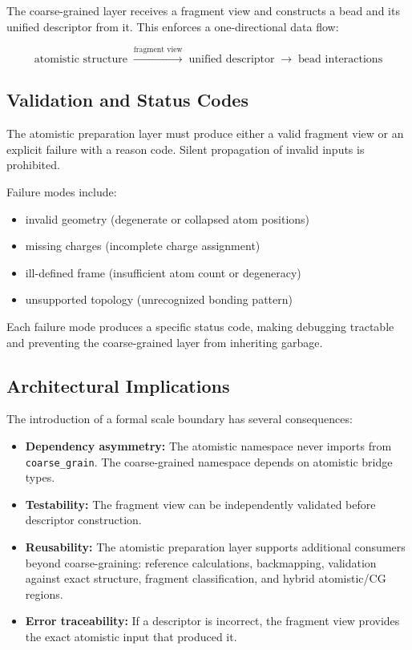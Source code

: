 \documentclass[11pt]{article}
\begin{document}
The coarse-grained layer receives a fragment view and constructs a bead and its unified descriptor from it. This enforces a one-directional data flow:

\begin{equation}
\text{atomistic structure} \;\xrightarrow{\text{fragment view}}\; \text{unified descriptor} \;\rightarrow\; \text{bead interactions}
\end{equation}

\subsection{Validation and Status Codes}

The atomistic preparation layer must produce either a valid fragment view or an explicit failure with a reason code. Silent propagation of invalid inputs is prohibited.

Failure modes include:

\begin{itemize}
    \item invalid geometry (degenerate or collapsed atom positions)
    \item missing charges (incomplete charge assignment)
    \item ill-defined frame (insufficient atom count or degeneracy)
    \item unsupported topology (unrecognized bonding pattern)
\end{itemize}

Each failure mode produces a specific status code, making debugging tractable and preventing the coarse-grained layer from inheriting garbage.

\subsection{Architectural Implications}

The introduction of a formal scale boundary has several consequences:

\begin{itemize}
    \item \textbf{Dependency asymmetry:} The atomistic namespace never imports from \texttt{coarse\_grain}. The coarse-grained namespace depends on atomistic bridge types.
    \item \textbf{Testability:} The fragment view can be independently validated before descriptor construction.
    \item \textbf{Reusability:} The atomistic preparation layer supports additional consumers beyond coarse-graining: reference calculations, backmapping, validation against exact structure, fragment classification, and hybrid atomistic/CG regions.
    \item \textbf{Error traceability:} If a descriptor is incorrect, the fragment view provides the exact atomistic input that produced it.
\end{itemize}
\end{document}
